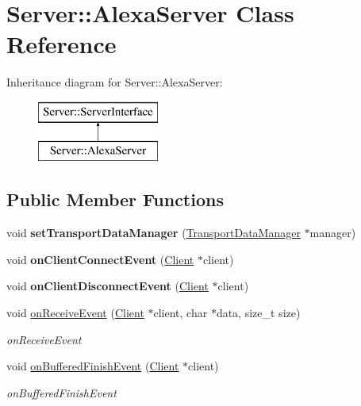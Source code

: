 \hypertarget{classServer_1_1AlexaServer}{}\section{Server\+:\+:Alexa\+Server Class Reference}
\label{classServer_1_1AlexaServer}
Inheritance diagram for Server\+:\+:Alexa\+Server\+:\begin{figure}[H]
\begin{center}
\leavevmode
\includegraphics[height=2.000000cm]{dc/d9a/classServer_1_1AlexaServer}
\end{center}
\end{figure}
\subsection*{Public Member Functions}
\begin{DoxyCompactItemize}
\item 
\mbox{\label{classServer_1_1AlexaServer_a39ea9b02fb72de34fd720b9d7c4f3259}} 
void {\bfseries set\+Transport\+Data\+Manager} (\hyperlink{classServer_1_1TransportDataManager}{Transport\+Data\+Manager} $\ast$manager)
\item 
\mbox{\label{classServer_1_1AlexaServer_ad0cf76f36bebc716b70398fd40537ab2}} 
void {\bfseries on\+Client\+Connect\+Event} (\hyperlink{classServer_1_1Client}{Client} $\ast$client)
\item 
\mbox{\label{classServer_1_1AlexaServer_afe60ce9b72931bc772ee83f12603c519}} 
void {\bfseries on\+Client\+Disconnect\+Event} (\hyperlink{classServer_1_1Client}{Client} $\ast$client)
\item 
void \hyperlink{classServer_1_1AlexaServer_aba8fd18008128f94c9d9d9c3f510b345}{on\+Receive\+Event} (\hyperlink{classServer_1_1Client}{Client} $\ast$client, char $\ast$data, size\+\_\+t size)
\begin{DoxyCompactList}\small\item\em on\+Receive\+Event \end{DoxyCompactList}\item 
void \hyperlink{classServer_1_1AlexaServer_a6bb271d518315a17feee8dec73135244}{on\+Buffered\+Finish\+Event} (\hyperlink{classServer_1_1Client}{Client} $\ast$client)
\begin{DoxyCompactList}\small\item\em on\+Buffered\+Finish\+Event \end{DoxyCompactList}\end{DoxyCompactItemize}


